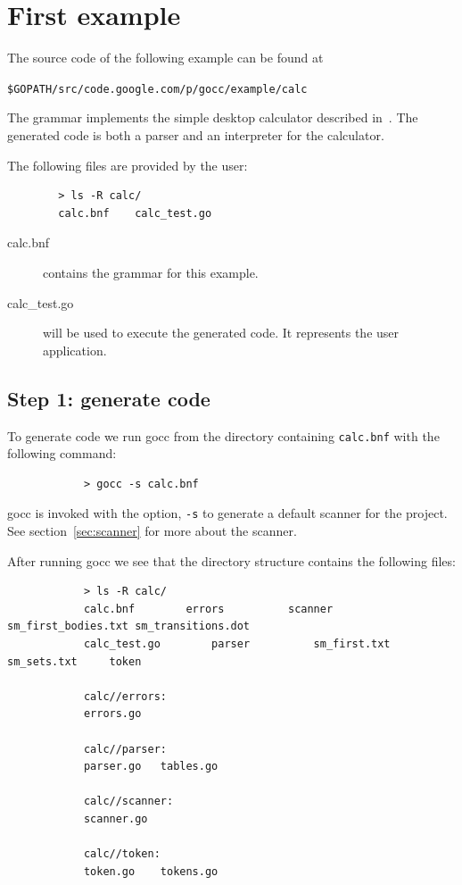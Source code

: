 \documentclass[12pt]{article}
\begin{document}
\section{First example}
	The source code of the following example can be found at 

	\verb|$GOPATH/src/code.google.com/p/gocc/example/calc| 

	The grammar implements the simple desktop calculator described in~\cite{Dragon Book}. The generated code is both a parser and an interpreter for the calculator.

	The following files are provided by the user:
	\begin{verbatim}
		> ls -R calc/
		calc.bnf	calc_test.go	
	\end{verbatim}

	\begin{description}
		\item[calc.bnf] contains the grammar for this example.

		\item[calc\_test.go] will be used to execute the generated code. It represents the user application.

	\end{description}

	\subsection{Step 1: generate code}
		To generate code we run gocc from the directory containing \verb|calc.bnf| with the following command:

		\begin{verbatim}
			> gocc -s calc.bnf
		\end{verbatim}

		gocc is invoked with the option, \verb|-s| to generate a default scanner for the project. See section~\ref{sec:scanner} for more about the scanner.

		After running gocc we see that the directory structure contains the following files:

		\begin{verbatim}
			> ls -R calc/
			calc.bnf		errors			scanner			sm_first_bodies.txt	sm_transitions.dot
			calc_test.go		parser			sm_first.txt		sm_sets.txt		token

			calc//errors:
			errors.go

			calc//parser:
			parser.go	tables.go

			calc//scanner:
			scanner.go

			calc//token:
			token.go	tokens.go
		\end{verbatim}
\end{document}
